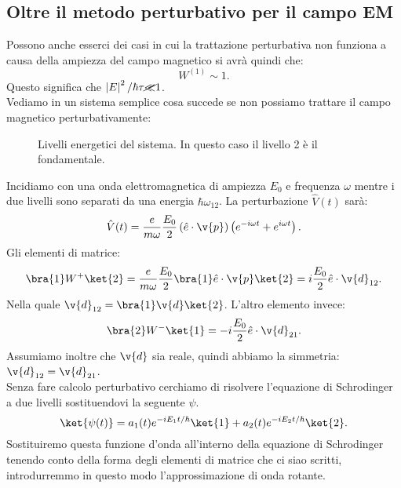 \subsection{Oltre il metodo perturbativo per il campo EM}%
Possono anche esserci dei casi in cui la trattazione perturbativa non funziona a causa della ampiezza del campo magnetico si avrà quindi che:
\[
    W^{(1)}\sim  1 
.\] 
Questo significa che $\left|E\right|^2 /\hbar \tau  \cancel{\ll }1$. \\
Vediamo in un sistema semplice cosa succede se non possiamo trattare il campo magnetico perturbativamente:
\begin{figure}[H]
    \centering
    \caption{Livelli energetici del sistema. In questo caso il livello 2 è il fondamentale.}
    \label{fig:livelliarimondo}
\end{figure}
\noindent
Incidiamo con una onda elettromagnetica di ampiezza $E_0$ e frequenza $\omega$ mentre i due livelli sono separati da una energia $\hbar \omega_{12}$. La perturbazione $\hat{V}(t) $ sarà:
\[
    \hat{V}(t) = \frac{e}{m\omega} \frac{E_0}{2}\left(\hat{e}\cdot \v{p}\right)
    \left(e^{-i\omega t}+e^{i\omega t}\right)
.\] 
Gli elementi di matrice:
\[
\bra{1}W^+ \ket{2}= \frac{e}{m\omega}\frac{E_0}{2}\bra{1}\hat{e}\cdot \v{p}\ket{2}=
i \frac{E_0}{2}\hat{e}\cdot \v{d}_{12} 
.\] 
Nella quale $\v{d}_{12} = \bra{1}\v{d} \ket{2}$. L'altro elemento invece:
\[
\bra{2}W^- \ket{1}=-
i \frac{E_0}{2}\hat{e}\cdot \v{d}_{21} 
.\] 
Assumiamo inoltre che $\v{d}$ sia reale, quindi abbiamo la simmetria: $\v{d}_{12}=\v{d}_{21}$.\\
Senza fare calcolo perturbativo cerchiamo di risolvere l'equazione di Schrodinger a due livelli sostituendovi la seguente $\psi$.
\[
    \ket{\psi(t) }=
    a_1(t) e^{-iE_1t /\hbar }\ket{1}+a_2(t) e^{-i E_2t /\hbar }\ket{2}
.\] 
Sostituiremo questa funzione d'onda all'interno della equazione di Schrodinger tenendo conto della forma degli elementi di matrice che ci siao scritti, introdurremmo in questo modo l'approssimazione di onda rotante.
